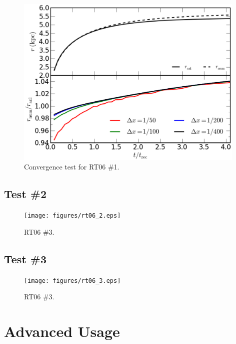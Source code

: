 \documentclass[letterpaper,titlepage,12pt]{article}
\numberwithin{equation}{section}
\begin{document}
\begin{figure}[htbp!]
\begin{center}
\includegraphics[width=0.98\textwidth]{figures/rt06_1_convergence.eps}
\caption{Convergence test for RT06 \#1.}
\label{fig:RT06_1}
\end{center}
\end{figure}

\subsection{Test \#2}

\begin{figure}[htbp!]
\begin{center}
\texttt{[image: figures/rt06\_2.eps]}
\caption{RT06 \#3.}
\label{fig:RT06_2}
\end{center}
\end{figure}
            
\subsection{Test \#3}

\begin{figure}[htbp!]
\begin{center}
\texttt{[image: figures/rt06\_3.eps]}
\caption{RT06 \#3.}
\label{fig:RT06_3}
\end{center}
\end{figure}

\section{Advanced Usage}
\end{document}
